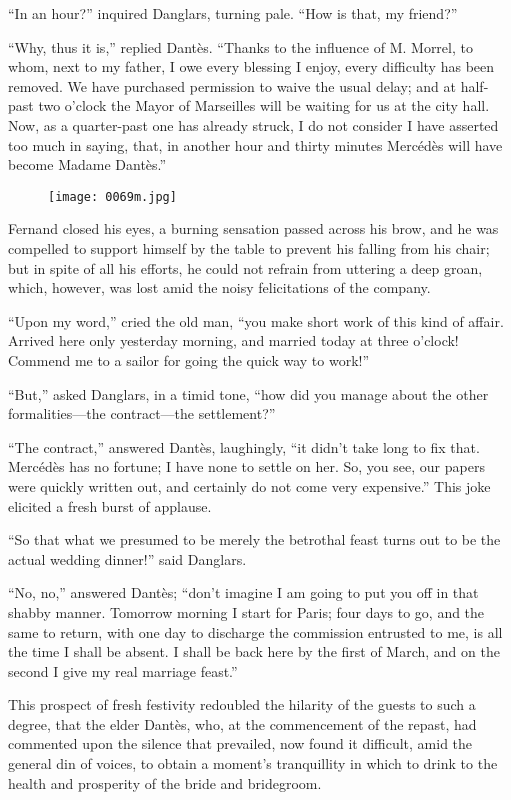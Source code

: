 “In an hour?” inquired Danglars, turning pale. “How is that, my
friend?”

“Why, thus it is,” replied Dantès. “Thanks to the influence of M.
Morrel, to whom, next to my father, I owe every blessing I enjoy, every
difficulty has been removed. We have purchased permission to waive the
usual delay; and at half-past two o’clock the Mayor of Marseilles will
be waiting for us at the city hall. Now, as a quarter-past one has
already struck, I do not consider I have asserted too much in saying,
that, in another hour and thirty minutes Mercédès will have become
Madame Dantès.”

\begin{figure}[h]
\texttt{[image: 0069m.jpg]}
\end{figure}

Fernand closed his eyes, a burning sensation passed across his brow,
and he was compelled to support himself by the table to prevent his
falling from his chair; but in spite of all his efforts, he could not
refrain from uttering a deep groan, which, however, was lost amid the
noisy felicitations of the company.

“Upon my word,” cried the old man, “you make short work of this kind of
affair. Arrived here only yesterday morning, and married today at three
o’clock! Commend me to a sailor for going the quick way to work!”

“But,” asked Danglars, in a timid tone, “how did you manage about the
other formalities—the contract—the settlement?”

“The contract,” answered Dantès, laughingly, “it didn’t take long to
fix that. Mercédès has no fortune; I have none to settle on her. So,
you see, our papers were quickly written out, and certainly do not come
very expensive.” This joke elicited a fresh burst of applause.

“So that what we presumed to be merely the betrothal feast turns out to
be the actual wedding dinner!” said Danglars.

“No, no,” answered Dantès; “don’t imagine I am going to put you off in
that shabby manner. Tomorrow morning I start for Paris; four days to
go, and the same to return, with one day to discharge the commission
entrusted to me, is all the time I shall be absent. I shall be back
here by the first of March, and on the second I give my real marriage
feast.”

This prospect of fresh festivity redoubled the hilarity of the guests
to such a degree, that the elder Dantès, who, at the commencement of
the repast, had commented upon the silence that prevailed, now found it
difficult, amid the general din of voices, to obtain a moment’s
tranquillity in which to drink to the health and prosperity of the
bride and bridegroom.

